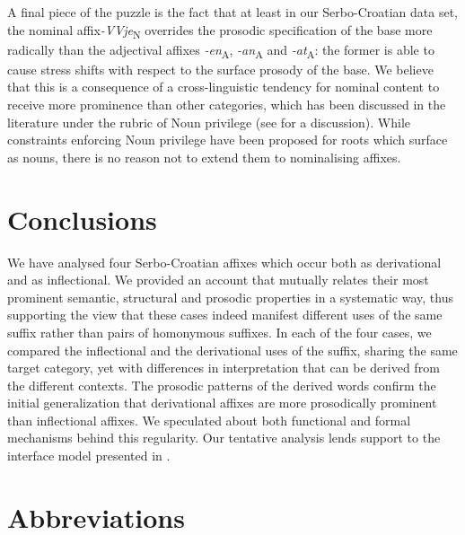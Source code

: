 \documentclass[output=paper]{langsci/langscibook}
\begin{document}
A final piece of the puzzle is the fact that at least in our Serbo-Croatian data set, the nominal affix\textit{-VVje}\textsubscript{N} overrides the prosodic specification of the base more radically than the adjectival affixes \textit{-en}\textsubscript{A}, \textit{-an}\textsubscript{A} and \textit{-at}\textsubscript{A}: the former is able to cause stress shifts with respect to the surface prosody of the base. We believe that this is a consequence of a cross-linguistic tendency for nominal content to receive more prominence than other categories, which has been discussed in the literature under the rubric of Noun privilege (see \citealt{Smi2011} for a discussion). While constraints enforcing Noun privilege have been proposed for roots which surface as nouns, there is no reason not to extend them to nominalising affixes.

\section{Conclusions}\label{sec:simonovic:7}
We have analysed four Serbo-Croatian affixes which occur both as derivational and as inflectional. We provided an account that mutually relates their most prominent semantic, structural and prosodic properties in a systematic way, thus supporting the view that these cases indeed manifest different uses of the same suffix rather than pairs of homonymous suffixes. In each of the four cases, we compared the inflectional and the derivational uses of the suffix, sharing the same target category, yet with differences in interpretation that can be derived from the different contexts.
The prosodic patterns of the derived words confirm the initial generalization that derivational affixes are more prosodically prominent than inflectional affixes. We speculated about both functional and formal mechanisms behind this regularity. Our tentative analysis lends support to the interface model presented in \cite{Revithiadou1999}. 


\section*{Abbreviations}
\end{document}
